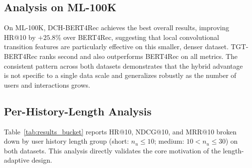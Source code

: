 \documentclass[12pt,a4paper]{report}
\begin{document}
\subsection*{Analysis on ML-100K}

On ML-100K, DCH-BERT4Rec achieves the best overall results, improving HR@10
by \(+25.8\%\) over BERT4Rec, suggesting that local convolutional transition
features are particularly effective on this smaller, denser dataset.
TGT-BERT4Rec ranks second and also outperforms BERT4Rec on all metrics.
The consistent pattern across both datasets demonstrates that the hybrid
advantage is not specific to a single data scale and generalizes robustly as
the number of users and interactions grows.

\subsection*{Per-History-Length Analysis}

Table~\ref{tab:results_bucket} reports HR@10, NDCG@10, and MRR@10 broken
down by user history length group (short: \(n_u \leq 10\); medium:
\(10 < n_u \leq 30\)) on both datasets. This analysis directly validates the
core motivation of the length-adaptive design.

\begin{table}[h]
\centering
\caption{Per-bucket HR@10 / NDCG@10 / MRR@10 on ML-1M and ML-100K. \(\dagger\) = proposed hybrid.}
\label{tab:results_bucket}
\end{table}
\end{document}
